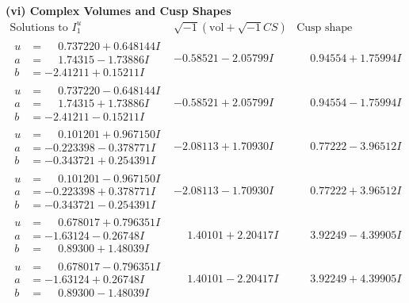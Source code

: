 \documentclass[1p]{elsarticle_modified}
\theoremstyle{definition}
\newcommand{\I}{\sqrt{-1}}
\begin{document}
\newpage\flushleft \textbf{(vi) Complex Volumes and Cusp Shapes}
$$\begin{array}{c|c|c}  
\text{Solutions to }I^u_{1}& \I (\text{vol} + \sqrt{-1}CS) & \text{Cusp shape}\\
 \hline 
\begin{aligned}
u &= \phantom{-}0.737220 + 0.648144 I \\
a &= \phantom{-}1.74315 - 1.73886 I \\
b &= -2.41211 + 0.15211 I\end{aligned}
 & -0.58521 - 2.05799 I & \phantom{-}0.94554 + 1.75994 I \\ \hline\begin{aligned}
u &= \phantom{-}0.737220 - 0.648144 I \\
a &= \phantom{-}1.74315 + 1.73886 I \\
b &= -2.41211 - 0.15211 I\end{aligned}
 & -0.58521 + 2.05799 I & \phantom{-}0.94554 - 1.75994 I \\ \hline\begin{aligned}
u &= \phantom{-}0.101201 + 0.967150 I \\
a &= -0.223398 - 0.378771 I \\
b &= -0.343721 + 0.254391 I\end{aligned}
 & -2.08113 + 1.70930 I & \phantom{-}0.77222 - 3.96512 I \\ \hline\begin{aligned}
u &= \phantom{-}0.101201 - 0.967150 I \\
a &= -0.223398 + 0.378771 I \\
b &= -0.343721 - 0.254391 I\end{aligned}
 & -2.08113 - 1.70930 I & \phantom{-}0.77222 + 3.96512 I \\ \hline\begin{aligned}
u &= \phantom{-}0.678017 + 0.796351 I \\
a &= -1.63124 - 0.26748 I \\
b &= \phantom{-}0.89300 + 1.48039 I\end{aligned}
 & \phantom{-}1.40101 + 2.20417 I & \phantom{-}3.92249 - 4.39905 I \\ \hline\begin{aligned}
u &= \phantom{-}0.678017 - 0.796351 I \\
a &= -1.63124 + 0.26748 I \\
b &= \phantom{-}0.89300 - 1.48039 I\end{aligned}
 & \phantom{-}1.40101 - 2.20417 I & \phantom{-}3.92249 + 4.39905 I \\ \hline\begin{aligned}

\end{aligned}
\end{array}$$
\end{document}
